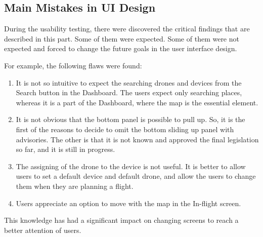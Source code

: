 \subsection{Main Mistakes in UI Design}\label{subsec:main-mistakes-in-ui-design}
During the usability testing, there were discovered the critical findings that are described in this part.
Some of them were expected.
Some of them were not expected and forced to change the future goals in the user interface design.

For example, the following flaws were found:
\begin{enumerate}
    \item It is not so intuitive to expect the searching drones and devices from the Search button in the Dashboard.
    The users expect only searching places, whereas it is a part of the Dashboard, where the map is the essential element.
    \item It is not obvious that the bottom panel is possible to pull up.
    So, it is the first of the reasons to decide to omit the bottom sliding up panel with advisories.
    The other is that it is not known and approved the final legislation so far, and it is still in progress.
    \item The assigning of the drone to the device is not useful.
    It is better to allow users to set a default device and default drone, and allow the users to change them when they are planning a flight.
    \item Users appreciate an option to move with the map in the In-flight screen.
\end{enumerate}
This knowledge has had a significant impact on changing screens to reach a better attention of users.
